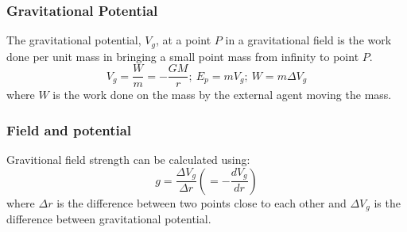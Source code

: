 \documentclass[a4paper,12pt]{article}
\begin{document}
\subsubsection*{Gravitational Potential}
The gravitational potential, $V_g$, at a point $P$ in a gravitational field is the work done per unit mass in bringing a small point mass from infinity to point $P$. 
\[V_g=\dfrac{W}{m}=-\dfrac{GM}{r};\ E_p=mV_g;\ W=m\Delta V_g\]
where $W$ is the work done on the mass by the external agent moving the mass.
\subsubsection*{Field and potential}
Gravitional field strength can be calculated using:
\[g=\dfrac{\Delta V_g}{\Delta r}\left(=-\dfrac{dV_g}{dr}\right)\]
where $\Delta r$ is the difference between two points close to each other and $\Delta V_g$ is the difference between gravitational potential.
\end{document}

